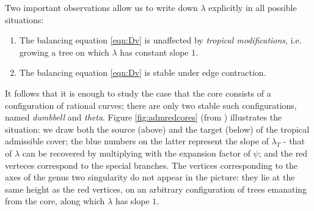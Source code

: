 \documentclass{compositio}
\theoremstyle{plain}
\theoremstyle{definition}
\theoremstyle{remark}
\begin{document}
 Two important observations allow us to write down $\lambda$ explicitly in all possible situations:
 \begin{enumerate}
  \item The balancing equation \eqref{eqn:Dv} is unaffected by \emph{tropical modifications}, i.e. growing a tree on which $\lambda$ has constant slope $1$.
  \item The balancing equation \eqref{eqn:Dv} is stable under edge contraction.
 \end{enumerate}
 It follows that it is enough to study the case that the core consists of a configuration of rational curves; there are only two stable such configurations, named \emph{dumbbell} and \emph{theta}. Figure \ref{fig:admredcores} (from \cite{BC}) illustrates the situation: we draw both the source (above) and the target (below) of the tropical admissible cover; the blue numbers on the latter represent the slope of $\lambda_T$ - that of $\lambda$ can be recovered by multiplying with the expansion factor of $\psi$; and the red verteces correspond to the special branches. The vertices corresponding to the axes of the genus two singularity do not appear in the picture: they lie at the same height as the red vertices, on an arbitrary configuration of trees emanating from the core, along which $\lambda$ has slope $1$.
\end{document}

